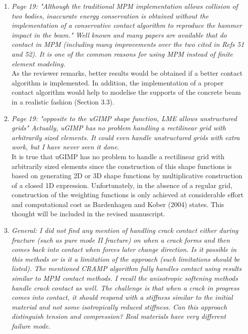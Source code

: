 \documentclass[12pt]{article}
\begin{document}
\begin{enumerate}
\item \textit{Page 19: "Although the traditional MPM implementation allows collision of two bodies, inaccurate energy conservation is obtained without the implementation of a conservative contact algorithm to reproduce the hammer impact in the beam." Well known and many papers are available that do contact in MPM (including many improvements over the two cited in Refs 51 and 52). It is one of the common reasons for using MPM instead of finite element modeling.}\\

As the reviewer remarks, better results would be obtained if a better contact algorithm is implemented. In addition, the implementation of a proper contact algorithm would help to modelise the supports of the concrete beam in a realistic fashion (Section 3.3). 

\item \textit{Page 19: "opposite to the uGIMP shape function, LME allows unstructured grids" Actually, uGIMP has no problem handling a rectilinear grid with arbitrarily sized elements. It could even handle unstructured grids with extra work, but I have never seen it done.}\\

It is true that uGIMP has no problem to handle a rectilinear grid with arbitrarily sized elements since the construction of this shape functions is based on generating 2D or 3D shape functions by multiplicative construction of a closed 1D expression. Unfortunately, in the absence of a regular grid, construction of the weighting functions is only achieved at considerable effort and computational cost as Bardenhagen and Kober \cite{Bardenhagen_2004} (2004) states. This thought will be included in the revised manuscript. 

\item \textit{General: I did not find any mention of handling crack contact either during fracture (such as pure mode II fracture) on when a crack forms and then comes back into contact when forces later change direction. Is it possible in this methods or is it a limitation of the approach (such limitations should be listed). The mentioned CRAMP algorithm fully handles contact using results similar to MPM contact methods. I recall the anisotropic softening methods handle crack contact as well. The challenge is that when a crack in progress comes into contact, it should respond with a stiffness similar to the initial material and not some isotropically reduced stiffness. Can this approach distinguish tension and compression? Real materials have very different failure mode.}\\


\end{enumerate}
\end{document}
